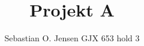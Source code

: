 \documentclass[12pt]{article}
\title{Projekt A}
\author{Sebastian O. Jensen
		GJX 653
		hold 3}
\begin{document}
\newcommand{\Eone}{
\left(\begin{array}{ccc}
1&0&0
\\
-4&1&0
\\
0&0&1
\end{array}\right)
  }
  
\newcommand{\Etwo}{  
\left(\begin{array}{ccc}
1&0&0
\\
0&0&1
\\
0&1&0
\end{array}\right)
}

\newcommand{\Ethree}{
\left(\begin{array}{ccc}
1&0&0
\\
0&1&0
\\
0&0&1/5
\end{array}\right)
}

\newcommand{\Efour}{
\left(\begin{array}{ccc}
1&0&1
\\
0&1&0
\\
0&0&1
\end{array}\right)
}

\newcommand{\fourXthree}{
\left(\begin{array}{ccc}
1&0&1/5
\\
0&1&0
\\
0&0&1/5
\end{array}\right)
  }
  
\newcommand{\fourXthreeXtwo}{
\left(\begin{array}{ccc}
1&1/5&0
\\
0&0&1
\\
0&1/5&0
\end{array}\right)
  }  
  
\newcommand{\fourXthreeXtwoXone}{
\left(\begin{array}{ccc}
1/5&1/5&0
\\
0&0&1
\\
-4/5&1/5&0
\end{array}\right)
  }  

\newcommand{\fiveXfourXthreeXtwoXone}{
\left(\begin{array}{ccc}
1&1&0
\\
0&0&1
\\
-4&1&0
\end{array}\right)
  }  
  
\maketitle
\end{document}
